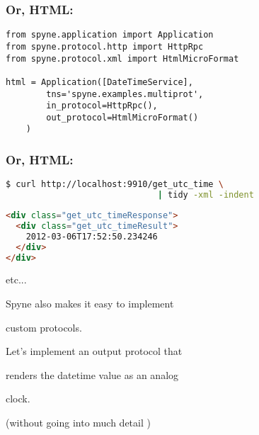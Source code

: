 \documentclass{beamer}
\begin{document}
\begin{frame}[fragile]
  \frametitle{Or, HTML:}

  \begin{lstlisting}
from spyne.application import Application
from spyne.protocol.http import HttpRpc
from spyne.protocol.xml import HtmlMicroFormat

html = Application([DateTimeService],
        tns='spyne.examples.multiprot',
        in_protocol=HttpRpc(),
        out_protocol=HtmlMicroFormat()
    )
  \end{lstlisting}
\end{frame}


\begin{frame}[fragile]
  \frametitle{Or, HTML:}

  \begin{lstlisting}[language=sh,frame=topline]
$ curl http://localhost:9910/get_utc_time \
                              | tidy -xml -indent
  \end{lstlisting}
  \begin{lstlisting}[language=html, frame=bottomline]
<div class="get_utc_timeResponse">
  <div class="get_utc_timeResult">
    2012-03-06T17:52:50.234246
  </div>
</div>
  \end{lstlisting}
\end{frame}


\begin{frame}
  \LARGE
  \begin{center}
    etc...
  \end{center}
\end{frame}

\begin{frame}
  \LARGE
  \begin{center}
    Spyne also makes it easy to implement

    \bigskip

    custom protocols.
  \end{center}
\end{frame}

\begin{frame}
  \LARGE
  \begin{center}
    Let's implement an output protocol that

    \bigskip

    renders the datetime value as an analog

    \bigskip

    clock.

    \bigskip
    \large
    (without going into much detail \smiley)

  \end{center}
\end{frame}
\end{document}
